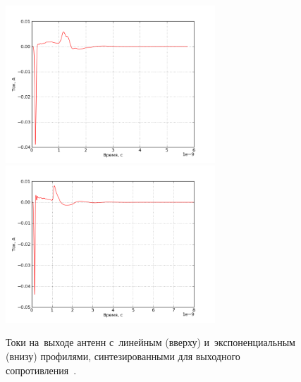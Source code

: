 \begin{figure}[p]
\centering
\includegraphics[width=0.7\textwidth]{graphics/directional-patterns-reply-linear-I}
\includegraphics[width=0.7\textwidth]{graphics/directional-patterns-reply-exponential-I}
\caption{
    Токи на~выходе антенн с~линейным (вверху) и~экспоненциальным (внизу)
    профилями, синтезированными для выходного сопротивления~.}
\label{fig:ReplyCurrents377}
\end{figure}

